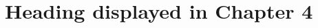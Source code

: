 \chapter[\leavevmode\newline Heading of Chapter 4 to show in TOC]{Heading displayed in  Chapter 4}
\label{chap:Chapter_4}
\lipsum[4]